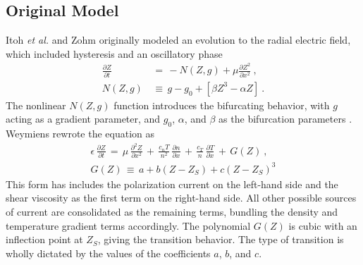 \subsection{Original Model}\label{ssec:original_Z_equation}
Itoh \emph{et al.} \cite{itoh_edge_1991} and Zohm \cite{zohm_dynamic_1994} originally modeled an evolution to the radial electric field, which included hysteresis and an oscillatory phase
\begin{align} %
	\frac{\partial Z}{\partial t} \,&=\, -N(Z,g) + \mu \frac{\partial Z^2}{\partial x^2}~,\label{eq:original_z} \\
	N(Z,g) \,&\equiv\, g - g_0 + \left[\beta Z^3 - \alpha Z\right]~.
\end{align}
The nonlinear $N(Z,g)$ function introduces the bifurcating behavior, with $g$ acting as a gradient parameter, and $g_0$, $\alpha$, and $\beta$ as the bifurcation parameters \cite{itoh_model_1988}.
Weymiens \cite{weymiens_bifurcation_2012} rewrote the equation as
\begin{align} %
	\epsilon \, \frac{\partial Z}{\partial t} \,=\, \mu \,
		\frac{\partial^2 Z}{\partial x^2} \,+\, \frac{c_n T}{n^2} \,
		\frac{\partial n}{\partial x} \,+\, \frac{c_T}{n} \,
		\frac{\partial T}{\partial x} \,+\, G(Z)~,\label{eq:paquay_Z} \\
	G(Z) \,\equiv\, a + b(Z - Z_S) + c(Z - Z_S)^3 \label{eq:G_polynomial}
\end{align}
This form has includes the polarization current on the left-hand side and the shear viscosity as the first term on the right-hand side.
All other possible sources of current are consolidated as the remaining terms, bundling the density and temperature gradient terms accordingly.
The polynomial $G(Z)$ is cubic with an inflection point at $Z_S$, giving the transition behavior.
The type of transition is wholly dictated by the values of the coefficients $a$, $b$, and $c$.

